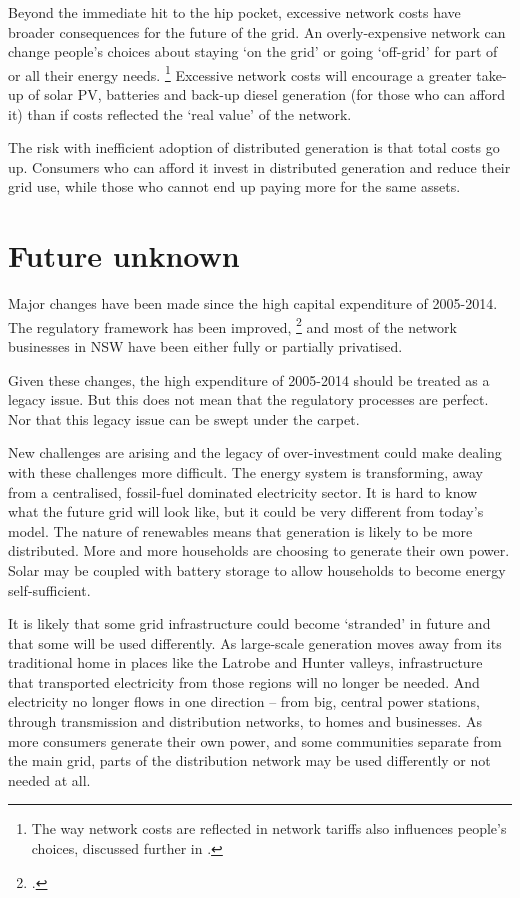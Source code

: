 \documentclass[FrontPage]{grattan}
\begin{document}
Beyond the immediate hit to the hip pocket, excessive network costs have broader consequences for the future of the grid. An overly-expensive network can change people's choices about staying `on the grid' or going `off-grid' for part of or all their energy needs.%
\footnote{The way network costs are reflected in network tariffs also influences people's choices, discussed further in .}
Excessive network costs will encourage a greater take-up of solar PV, batteries and back-up diesel generation (for those who can afford it) than if costs reflected the `real value' of the network.

The risk with inefficient adoption of distributed generation is that total costs go up. Consumers who can afford it invest in distributed generation and reduce their grid use, while those who cannot end up paying more for the same assets.

\section{Future unknown}\label{sec:future-unknown}
Major changes have been made since the high capital expenditure of 2005-2014. The regulatory framework has been improved,%
\footcite{AER2014betterregulation} and most of the network businesses in NSW have been either fully or partially privatised. 

Given these changes, the high expenditure of 2005-2014 should be treated as a legacy issue. But this does not mean that the regulatory processes are perfect. Nor that this legacy issue can be swept under the carpet.

New challenges are arising and the legacy of over-investment could make dealing with these challenges more difficult. The energy system is transforming, away from a centralised, fossil-fuel dominated electricity sector. It is hard to know what the future grid will look like, but it could be very different from today's model. The nature of renewables means that generation is likely to be more distributed. More and more households are choosing to generate their own power. Solar may be coupled with battery storage to allow households to become energy self-sufficient. 

It is likely that some grid infrastructure could become `stranded' in future and that some will be used differently. As large-scale generation moves away from its traditional home in places like the Latrobe and Hunter valleys, infrastructure that transported electricity from those regions will no longer be needed. And electricity no longer flows in one direction -- from big, central power stations, through transmission and distribution networks, to homes and businesses. As more consumers generate their own power, and some communities separate from the main grid, parts of the distribution network may be used differently or not needed at all.
\end{document}
